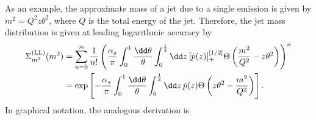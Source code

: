 \documentclass[letterpaper,11pt]{article}
\begin{document}
As an example, the approximate mass of a jet due to a single emission is given by \(m^2 = Q^2 z\theta^2\), where \(Q\) is the total energy of the jet.
%
Therefore, the jet mass distribution is given at leading logarithmic accuracy by
%
\begin{equation}
\begin{aligned}
    \Sigma^{\rm(LL)}_{m^2}(m^2)
    &=
    \sum_{n = 0}^{\infty}\frac{1}{n!}
    \left(
    \frac{\alpha_s}{\pi}
    \int_0^1 \frac{\dd\theta}{\theta}
    \int_0^{\frac{1}{2}} \dd z\,[\bar{p}(z)]_+^{[1/2]}
    \Theta\left(
    \frac{m^2}{Q^2} - z\theta^2
    \right)
    \right)^n
    \\
    &=
    \exp\left[
    -\frac{\alpha_s}{\pi}
    \int_0^1 \frac{\dd\theta}{\theta}
    \int_0^{\frac{1}{2}} \dd z\,\bar{p}(z)
    \Theta\left(
    z \theta^2 - \frac{m^2}{Q^2}
    \right)
    \right]
    .
\end{aligned}
\end{equation}
In graphical notation, the analogous derivation is
\end{document}
